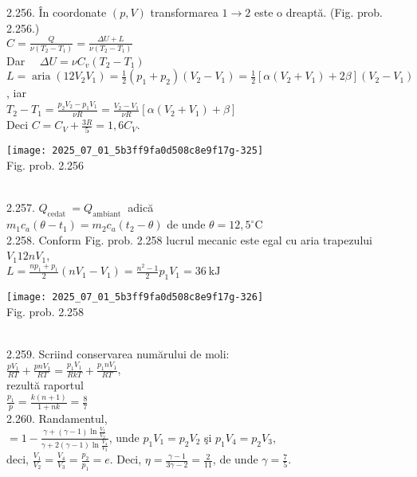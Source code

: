 2.256. În coordonate $(p, V)$ transformarea $1 \rightarrow 2$ este o dreaptă. (Fig. prob. 2.256.)\\ $C=\frac{Q}{\nu\left(T_{2}-T_{1}\right)}=\frac{\Delta U+L}{\nu\left(T_{2}-T_{1}\right)}$\\ Dar $\quad \Delta U=\nu C_{v}\left(T_{2}-T_{1}\right)$\\ $L=\operatorname{aria}\left(12 V_{2} V_{1}\right)=\frac{1}{2}\left(p_{1}+p_{2}\right)\left(V_{2}-V_{1}\right)=\frac{1}{2}\left[\alpha\left(V_{2}+V_{1}\right)+2 \beta\right]\left(V_{2}-V_{1}\right)$, iar\\ $T_{2}-T_{1}=\frac{p_{2} V_{2}-p_{1} V_{1}}{\nu R}=\frac{V_{2}-V_{1}}{\nu R}\left[\alpha\left(V_{2}+V_{1}\right)+\beta\right]$\\ Deci $C=C_{V}+\frac{3 R}{5}=1,6 C_{V}$.\\ \begin{center} \texttt{[image: 2025\_07\_01\_5b3ff9fa0d508c8e9f17g-325]}\\ Fig. prob. 2.256 \end{center}\\

2.257. $Q_{\text {cedat }}=Q_{\text {ambiant }}$ adică\\ $m_{1} c_{a}\left(\theta-t_{1}\right)=m_{2} c_{a}\left(t_{2}-\theta\right)$ de unde $\theta=12,5^{\circ} \mathrm{C}$\\

2.258. Conform Fig. prob. 2.258 lucrul mecanic este egal cu aria trapezului $V_{1} 12 n V_{1}$,\\ $L=\frac{n p_{1}+p_{1}}{2}\left(n V_{1}-V_{1}\right)=\frac{n^{2}-1}{2} p_{1} V_{1}=36 \mathrm{~kJ}$\\ \begin{center} \texttt{[image: 2025\_07\_01\_5b3ff9fa0d508c8e9f17g-326]}\\ Fig. prob. 2.258 \end{center}\\

2.259. Scriind conservarea numărului de moli:\\ $\frac{p V_{1}}{R T}+\frac{p n V_{1}}{R T}=\frac{p_{1} V_{1}}{R k T}+\frac{p_{1} n V_{1}}{R T}$, \\ rezultă raportul\\ $\frac{p_{1}}{p}=\frac{k(n+1)}{1+n k}=\frac{8}{7}$\\

2.260. Randamentul,\\ $=1-\frac{\gamma+(\gamma-1) \ln \frac{V_{1}}{V_{2}}}{\gamma+2(\gamma-1) \ln \frac{V_{4}}{V_{3}}}$, unde $p_{1} V_{1}=p_{2} V_{2}$ şi $p_{1} V_{4}=p_{2} V_{3}$,\\ deci, $\frac{V_{1}}{V_{2}}=\frac{V_{4}}{V_{3}}=\frac{p_{2}}{p_{1}}=e$. Deci, $\eta=\frac{\gamma-1}{3 \gamma-2}=\frac{2}{11}$, de unde $\gamma=\frac{7}{5}$.\\

